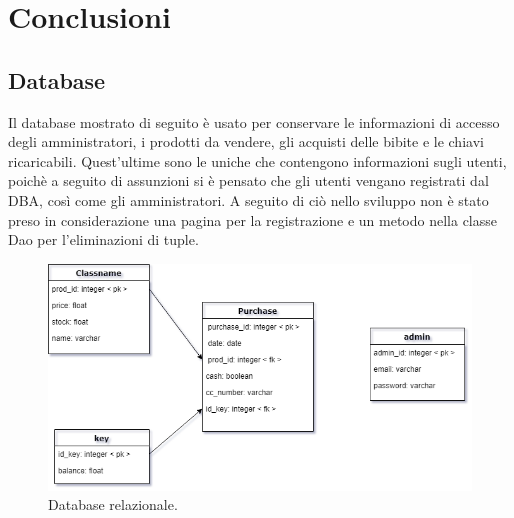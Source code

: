 \chapter{Conclusioni} \label{cap3}
\def\baselinestretch{1.66}
\section{Database}
Il database mostrato di seguito \`e usato per conservare le informazioni di accesso degli
amministratori, i prodotti da vendere, gli acquisti delle bibite e le chiavi ricaricabili.
Quest'ultime sono le uniche che contengono informazioni sugli utenti, poich\`e a seguito di assunzioni
si \`e pensato che gli utenti vengano registrati dal DBA, cos\`i come gli amministratori. A
seguito di ci\`o nello sviluppo non \`e stato preso in considerazione una pagina per la registrazione e un metodo nella classe Dao per l'eliminazioni di tuple.

\begin{figure}[ht]
    \centering
    \includegraphics[scale=0.5]{img/database.png}
    \caption{Database relazionale.}
\end{figure}
